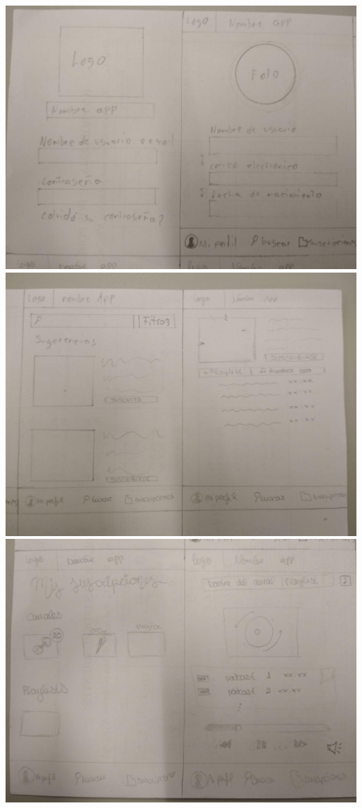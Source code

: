 \documentclass[a4paper]{article}
\begin{document}
\begin{center}
\includegraphics[width=0.7\columnwidth]{Boceto-1.jpg} \\
\includegraphics[width=0.7\columnwidth]{Boceto-2.jpg} \\
\includegraphics[width=0.7\columnwidth]{Boceto-3.jpg} \\

\end{center}
\end{document}
